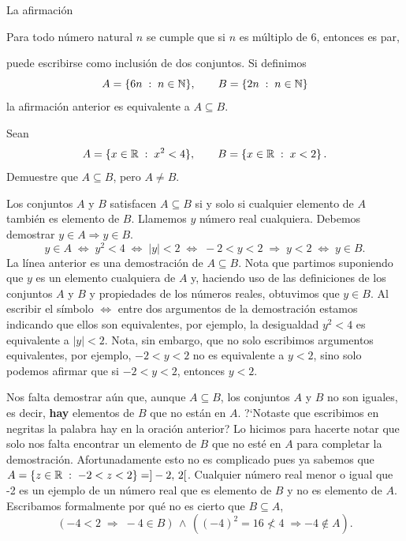 \medskip


\begin{ejemplo}
	La afirmaci\'on\\
	
	\centerline{Para todo n\'umero natural $n$ se cumple que si
	$n$ es m\'ultiplo de 6, entonces es par,}

	puede escribirse como inclusi\'on de dos conjuntos.
	Si definimos
	\[
		A = \{6n\;:\; n\in \mathbb{N}\},\qquad 
		B = \left\{2n\;:\; n\in \mathbb{N}\right\}
	\]
	la afirmaci\'on anterior es equivalente a $A \subseteq B$.
\end{ejemplo}

\medskip


\begin{ejemplo}\leavevmode
	Sean
	\[
		A = \{x\in \mathbb{R}\;:\; x^2 < 4\},\qquad 
		B = \left\{x \in \mathbb{R}\;:\; x < 2\right\}.
	\] 
	Demuestre que $A\subseteq B$, pero $A \ne B$.
	
	Los conjuntos $A$ y $B$ satisfacen
	$A \subseteq B$ si y solo si cualquier elemento
	de $A$ tambi\'en es elemento de $B$.
	Llamemos $y$ n\'umero real cualquiera.
	Debemos demostrar $y \in A \Rightarrow y \in B$.
	\[
		y \in A\;\Leftrightarrow \; 
		y^2 < 4 \; \Leftrightarrow\; |y| < 2\;\Leftrightarrow\;
		-2 < y < 2\; \Rightarrow \; y < 2 \; \Leftrightarrow\;
		y \in B.
	\]
	La l\'inea anterior es una demostraci\'on de $A \subseteq B$.
	Nota que partimos suponiendo que $y$ es un elemento cualquiera
	de $A$ y, haciendo uso de las definiciones de los conjuntos
	$A$ y $B$ y propiedades de los n\'umeros reales, obtuvimos 
	que $y \in B$.
	Al escribir el s\'imbolo $\Leftrightarrow$ entre dos argumentos
	de la demostraci\'on estamos indicando que ellos son equivalentes,
	por ejemplo, la desigualdad $y^2 < 4$ es equivalente a 
	$|y| < 2$. Nota, sin embargo, que no solo escribimos argumentos
	equivalentes, por ejemplo, $-2 < y < 2$ no es equivalente a 
	$y < 2$, sino solo podemos afirmar que si $-2 < y < 2$, entonces
	$y < 2$.
	
	Nos falta demostrar a\'un que, aunque $A \subseteq B$, los conjuntos
	$A$ y $B$ no son iguales, es decir, \textbf{hay} elementos de $B$ que no
	est\'an en $A$. ?`Notaste que escribimos en negritas 
	la palabra hay en la oraci\'on
	anterior? Lo hicimos para hacerte notar que solo nos falta
	encontrar un elemento de $B$ que no est\'e en $A$ para completar
	la demostraci\'on. Afortunadamente esto no es complicado pues
	ya sabemos que $A = \{z \in \mathbb{R}\;:\; -2 < z < 2\} = ]-2,\,2[$.
	Cualquier n\'umero real menor o igual que -2 es un ejemplo
	de un n\'umero real que es elemento de $B$ y no es elemento de $A$.
	Escribamos formalmente por qu\'e no es cierto que $B\subseteq A$,
	\[
		\left(-4 < 2 \;\Rightarrow\; -4 \in B\right)\,\wedge\,
		\left((-4)^2 = 16 \not < 4 \;\Rightarrow -4 \not \in A\right).
	\]
\end{ejemplo}

